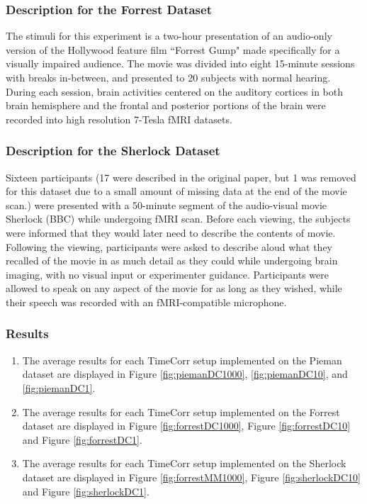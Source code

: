 \documentclass[11pt]{article}
\begin{document}
\subsubsection{Description for the Forrest Dataset}
The stimuli for this experiment is a two-hour presentation of an audio-only version of the Hollywood feature film ``Forrest Gump" made specifically for a visually impaired audience. The movie was divided into eight 15-minute sessions with breaks in-between, and presented to 20 subjects with normal hearing. During each session, brain activities centered on the auditory cortices in both brain hemisphere and the frontal and posterior portions of the brain were recorded into high resolution 7-Tesla fMRI datasets.\cite{Hanke2014}

\subsubsection{Description for the Sherlock Dataset}
Sixteen participants (17 were described in the original paper, but 1 was removed for this dataset due to a small amount of missing data at the end of the movie scan.) were presented with a 50-minute segment of the audio-visual movie Sherlock (BBC) while undergoing fMRI scan. Before each viewing, the subjects were informed that they would later need to describe the contents of movie. Following the viewing, participants were asked to describe aloud what they recalled of the movie in as much detail as they could while undergoing brain imaging, with no visual input or experimenter guidance. Participants were allowed to speak on any aspect of the movie for as long as they wished, while their speech was recorded with an fMRI-compatible microphone. \cite{Chen2017}

\subsubsection{Results}
\begin{enumerate}
\item The average results for each TimeCorr setup implemented on the Pieman dataset are displayed in Figure \ref{fig:piemanDC1000}, \ref{fig:piemanDC10}, and \ref{fig:piemanDC1}.
\item The average results for each TimeCorr setup implemented on the Forrest dataset are displayed in Figure \ref{fig:forrestDC1000}, Figure \ref{fig:forrestDC10} and Figure \ref{fig:forrestDC1}.
\item The average results for each TimeCorr setup implemented on the Sherlock dataset are displayed in Figure \ref{fig:forrestMM1000}, Figure \ref{fig:sherlockDC10} and Figure \ref{fig:sherlockDC1}.
\end{enumerate}
\end{document}
